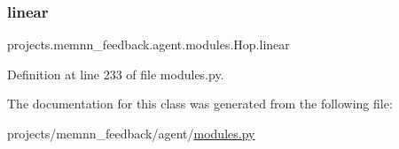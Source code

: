 \subsubsection{\texorpdfstring{linear}{linear}}
{\footnotesize\ttfamily projects.\+memnn\+\_\+feedback.\+agent.\+modules.\+Hop.\+linear}



Definition at line 233 of file modules.\+py.



The documentation for this class was generated from the following file\+:\begin{DoxyCompactItemize}
\item 
projects/memnn\+\_\+feedback/agent/\hyperlink{projects_2memnn__feedback_2agent_2modules_8py}{modules.\+py}\end{DoxyCompactItemize}
